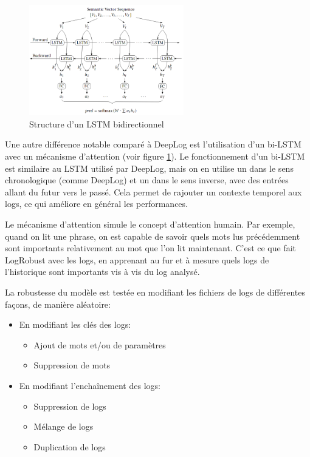 \documentclass[openany, 11pt]{memoir}
\begin{document}
\begin{figure}[ht]
	\centering
	\includegraphics[width=0.6\textwidth]{images/bilstm.png}
	\caption{Structure d'un LSTM bidirectionnel}
	\label{bilstm}
\end{figure}

\bigskip
Une autre différence notable comparé à DeepLog est l'utilisation d'un bi-\gls{LSTM} avec un mécanisme d'attention (voir figure \ref{bilstm}). Le fonctionnement d'un bi-LSTM est similaire au LSTM utilisé par DeepLog, mais on en utilise un dans le sens chronologique (comme DeepLog) et un dans le sens inverse, avec des entrées allant du futur vers le passé. Cela permet de rajouter un contexte temporel aux \glspl{log}, ce qui améliore en général les performances.

Le mécanisme d'attention simule le concept d'attention humain. Par exemple, quand on lit une phrase, on est capable de savoir quels mots lus précédemment sont importants relativement au mot que l'on lit maintenant. C'est ce que fait LogRobust avec les \glspl{log}, en apprenant au fur et à mesure quels logs de l'historique sont importants vis à vis du log analysé.

\bigskip
La robustesse du modèle est testée en modifiant les fichiers de \glspl{log} de différentes façons, de manière aléatoire:

\begin{itemize}
	\item En modifiant les clés des logs:
	\begin{itemize}
		\item Ajout de mots et/ou de paramètres
		\item Suppression de mots
	\end{itemize}
	\item En modifiant l'enchaînement des logs:
	\begin{itemize}
		\item Suppression de logs
		\item Mélange de logs
		\item Duplication de logs
	\end{itemize}
\end{itemize}
\end{document}

